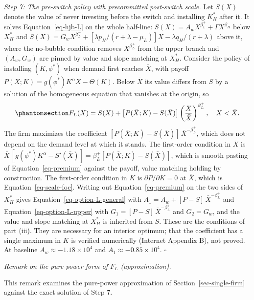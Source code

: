\documentclass[
  11pt,
  letterpaper,
]{scrartcl}
\begin{document}
\emph{Step 7: The pre-switch policy with precommitted post-switch
scale.} Let \(S(X)\) denote the value of never investing before the
switch and installing \(K_H^*\) after it. It solves
Equation~\ref{eq-hjb-L} on the whole half-line:
\(S(X) = A_w X^{\beta_L^+} + \Gamma X^{\beta_H}\) below \(X_H^*\) and
\(S(X) = G_w X^{\beta_L^-} + [\lambda p_H/(r + \lambda - \mu_L)] X - \lambda q_H/(r + \lambda)\)
above it, where the no-bubble condition removes \(X^{\beta_L^+}\) from
the upper branch and \((A_w, G_w)\) are pinned by value and slope
matching at \(X_H^*\). Consider the policy of installing \((K, \phi^*)\)
when demand first reaches \(\bar{X}\), with payoff
\(P(X; K) = g(\phi^*) K^\alpha X - \Theta(K)\). Below \(\bar{X}\) its
value differs from \(S\) by a solution of the homogeneous equation that
vanishes at the origin, so
\begin{equation}\protect\phantomsection\label{eq-premium}{
F_L(X) = S(X) + \bigl[P(\bar{X}; K) - S(\bar{X})\bigr] \left(\frac{X}{\bar{X}}\right)^{\beta_L^+}, \quad X < \bar{X}.
}\end{equation} The firm maximizes the coefficient
\([P(\bar{X}; K) - S(\bar{X})]\,\bar{X}^{-\beta_L^+}\), which does not
depend on the demand level at which it stands. The first-order condition
in \(\bar{X}\) is
\(\bar{X}\,[g(\phi^*) K^\alpha - S'(\bar{X})] = \beta_L^+ [P(\bar{X}; K) - S(\bar{X})]\),
which is smooth pasting of Equation~\ref{eq-premium} against the payoff,
value matching holding by construction. The first-order condition in
\(K\) is \(\partial P / \partial K = 0\) at \(\bar{X}\), which is
Equation~\ref{eq-scale-foc}. Writing out Equation~\ref{eq-premium} on
the two sides of \(X_H^*\) gives Equation~\ref{eq-option-L-general} with
\(A_1 = A_w + [P - S]\,\bar{X}^{-\beta_L^+}\) and
Equation~\ref{eq-option-L-upper} with
\(G_1 = [P - S]\,\bar{X}^{-\beta_L^+}\) and \(G_2 = G_w\), and the value
and slope matching at \(X_H^*\) is inherited from \(S\). These are the
conditions of part (iii). They are necessary for an interior optimum;
that the coefficient has a single maximum in \(K\) is verified
numerically (Internet Appendix B), not proved. At baseline
\(A_w \approx -1.18 \times 10^4\) and \(A_1 \approx -0.85 \times 10^4\).
\(\square\)

\emph{Remark on the pure-power form of \(F_L\) (approximation).}

This remark examines the pure-power approximation of
Section~\ref{sec-single-firm} against the exact solution of Step 7.
\end{document}

